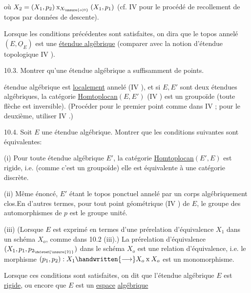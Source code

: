\margin{\handwritten{\unsure{$\chi$|$\times$}}}
où $X_2=(X_1,p_2)\mathbin{\mathrm{x}}_{X_{\unsure{o|0}}}(X_1,p_1)$ (cf. IV  pour le procédé de recollement de topos par données de descente).

Lorsque les conditions précédentes sont satisfaites, on dira que le topos annelé $(E,\underline{O}_E)$ est une \uline{étendue algébrique} (comparer avec la notion d'étendue topologique IV ).
\margin{\handwritten{$\times$}}

10.3. Montrer qu'une étendue algébrique a suffisamment de points.

\margin{\handwritten{$\times$}}
 étendue algébrique est \uline{localement} annelé (IV ), et si $E,E'$ sont deux étendues algébriques, la catégorie \uline{Homtoplocan}$(E,E')$ (IV ) est un groupoïde (toute flèche est inversible). (Procéder pour le premier point comme dans IV ; pour le deuxième, utiliser IV \hspace{2em}.)
\margin{\handwritten{$\times\quad\times$}}

10.4.  Soit $E$ une étendue algébrique. Montrer que les conditions suivantes sont équivalentes:
\margin{\handwritten{$\times$}}

(i) Pour toute étendue algébrique $E'$, la catégorie  \uline{Homtoplocan}$(E',E)$ est rigide, i.e.  (comme c'est un groupoïde) elle est équivalente à une catégorie discrète.

(ii) Même énoncé, $E'$ étant le topos ponctuel annelé par un corps algébriquement clos.En d'autres termes, pour tout point géométrique (IV ) de $E$, le groupe des automorphismes de $p$ est le groupe unité.
\margin{\handwritten{$\times$}}

(iii) (Lorsque $E$ est exprimé en termes d'une prérelation d'équivalence  $X_1$ dans un schéma $X_o$, comme dans 10.2 (iii).) La prérelation d'équivalence $(X_1,p_1,p_{2_{\deleted{\unsure{2}}}})$ dans le schéma $X_o$ est une relation d'équivalence, i.e. le morphisme $(p_1,p_2):X_1\handwritten{\longrightarrow}X_o\mathbin{\mathrm{x}}X_o$ est un monomorphisme.

Lorsque ces conditions sont satisfaites, on dit que l'étendue algébrique $E$ est \uline{rigide}, ou encore que $E$ est un \uline{espace} \uline{algébrique} \handwritten{(*)}


